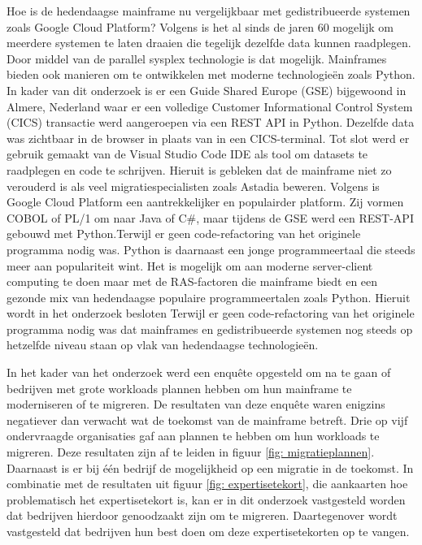 Hoe is de hedendaagse mainframe nu vergelijkbaar met gedistribueerde systemen zoals Google Cloud Platform? Volgens \textcite{Sarkar2020} is het al sinds de jaren 60 mogelijk om meerdere systemen te laten draaien die tegelijk dezelfde data kunnen raadplegen. Door middel van de parallel sysplex technologie is dat mogelijk. Mainframes bieden ook manieren om te ontwikkelen met moderne technologieën zoals Python. In kader van dit onderzoek is er een Guide Shared Europe (GSE) bijgewoond in Almere, Nederland waar er een volledige Customer Informational Control System (CICS) transactie werd aangeroepen via een REST API in Python. Dezelfde data was zichtbaar in de browser in plaats van in een CICS-terminal. Tot slot werd er gebruik gemaakt van de Visual Studio Code IDE als tool om datasets te raadplegen en code te schrijven. Hieruit is gebleken dat de mainframe niet zo verouderd is als veel migratiespecialisten zoals Astadia beweren. Volgens \autocite{Astadia2021} is Google Cloud Platform een aantrekkelijker en populairder platform. Zij vormen COBOL of PL/1  om naar Java of C\#, maar tijdens de GSE werd een REST-API gebouwd met Python.Terwijl er geen code-refactoring van het originele programma nodig was. Python is daarnaast een jonge programmeertaal die steeds meer aan populariteit wint.  Het is mogelijk om aan moderne server-client computing te doen maar met de RAS-factoren die mainframe biedt en een gezonde mix van hedendaagse populaire programmeertalen zoals Python. Hieruit wordt in het onderzoek besloten Terwijl er geen code-refactoring van het originele programma nodig was dat mainframes en gedistribueerde systemen nog steeds op hetzelfde niveau staan op vlak van hedendaagse technologieën. 

In het kader van het onderzoek werd een enquête opgesteld om na te gaan of bedrijven met grote workloads plannen hebben om hun mainframe te moderniseren of te migreren. De resultaten van deze enquête waren enigzins negatiever dan verwacht wat de toekomst van de mainframe betreft. Drie op vijf ondervraagde organisaties gaf aan plannen te hebben om hun workloads te migreren. Deze resultaten zijn af te leiden in figuur \ref{fig: migratieplannen}. Daarnaast is er bij één bedrijf de mogelijkheid op een migratie in de toekomst. In combinatie met de resultaten uit figuur \ref{fig: expertisetekort}, die aankaarten hoe problematisch het expertisetekort is, kan er in dit onderzoek vastgesteld worden dat bedrijven hierdoor genoodzaakt zijn om te migreren. Daartegenover wordt vastgesteld dat bedrijven hun best doen om deze expertisetekorten op te vangen. 

